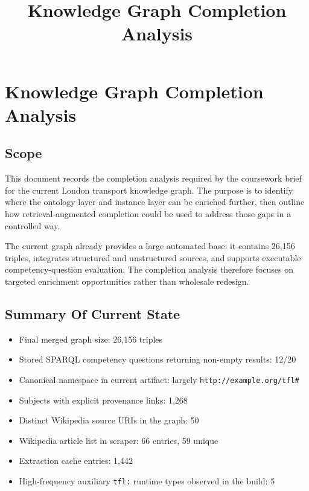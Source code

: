 \documentclass[
  11pt,
  a4paper,
]{article}
\title{Knowledge Graph Completion Analysis}
\author{}
\date{}
\providecommand{\tightlist}{%
  \setlength{\itemsep}{0pt}\setlength{\parskip}{0pt}}
\begin{document}
\maketitle

\section{Knowledge Graph Completion
Analysis}\label{knowledge-graph-completion-analysis}

\subsection{Scope}\label{scope}

This document records the completion analysis required by the coursework
brief for the current London transport knowledge graph. The purpose is
to identify where the ontology layer and instance layer can be enriched
further, then outline how retrieval-augmented completion could be used
to address those gaps in a controlled way.

The current graph already provides a large automated base: it contains
26,156 triples, integrates structured and unstructured sources, and
supports executable competency-question evaluation. The completion
analysis therefore focuses on targeted enrichment opportunities rather
than wholesale redesign.

\subsection{Summary Of Current State}\label{summary-of-current-state}

\begin{itemize}
\tightlist
\item
  Final merged graph size: 26,156 triples
\item
  Stored SPARQL competency questions returning non-empty results: 12/20
\item
  Canonical namespace in current artifact: largely
  \texttt{http://example.org/tfl\#}
\item
  Subjects with explicit provenance links: 1,268
\item
  Distinct Wikipedia source URIs in the graph: 50
\item
  Wikipedia article list in scraper: 66 entries, 59 unique
\item
  Extraction cache entries: 1,442
\item
  High-frequency auxiliary \texttt{tfl:} runtime types observed in the
  build: 5
\end{itemize}
\end{document}

